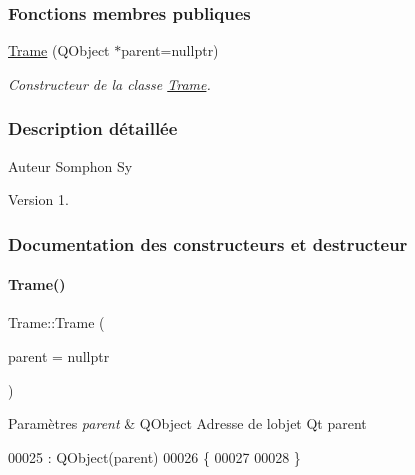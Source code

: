 \subsubsection*{Fonctions membres publiques}
\begin{DoxyCompactItemize}
\item 
\hyperlink{class_trame_ae40bffc8a1e3f6ad9dec4710b673a57a}{Trame} (Q\+Object $\ast$parent=nullptr)
\begin{DoxyCompactList}\small\item\em Constructeur de la classe \hyperlink{class_trame}{Trame}. \end{DoxyCompactList}\end{DoxyCompactItemize}


\subsubsection{Description détaillée}
\begin{DoxyAuthor}{Auteur}
Somphon Sy
\end{DoxyAuthor}
\begin{DoxyVersion}{Version}
1. 
\end{DoxyVersion}


\subsubsection{Documentation des constructeurs et destructeur}
\mbox{\label{class_trame_ae40bffc8a1e3f6ad9dec4710b673a57a}} 
\paragraph{\texorpdfstring{Trame()}{Trame()}}
{\footnotesize\ttfamily Trame\+::\+Trame (\begin{DoxyParamCaption}\item[{Q\+Object $\ast$}]{parent = {\ttfamily nullptr} }\end{DoxyParamCaption})\hspace{0.3cm}{\ttfamily [explicit]}}


\begin{DoxyParams}{Paramètres}
{\em parent} & Q\+Object Adresse de l\textquotesingle{}objet Qt parent \\
\hline
\end{DoxyParams}

\begin{DoxyCode}
00025                             : QObject(parent)
00026 \{
00027 
00028 \}
\end{DoxyCode}


